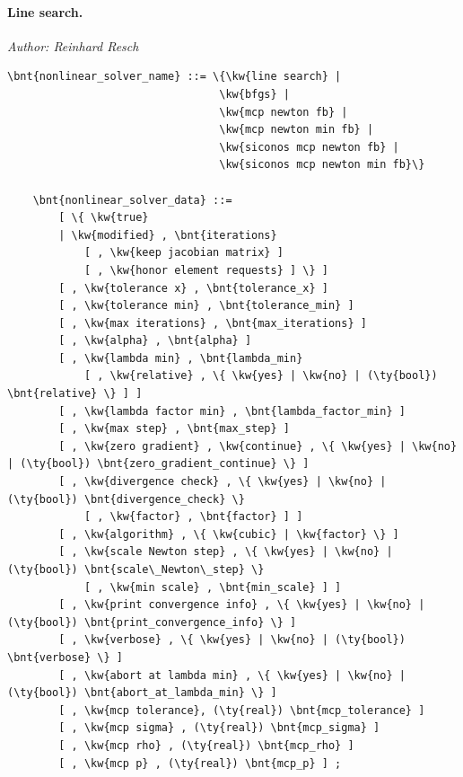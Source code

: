 \paragraph{Line search.}
\emph{Author: Reinhard Resch}
\begin{Verbatim}[commandchars=\\\{\}]
    \bnt{nonlinear_solver_name} ::= \{\kw{line search} |
                                 \kw{bfgs} |
                                 \kw{mcp newton fb} |
                                 \kw{mcp newton min fb} |
                                 \kw{siconos mcp newton fb} |
                                 \kw{siconos mcp newton min fb}\}

    \bnt{nonlinear_solver_data} ::= 
        [ \{ \kw{true}
        | \kw{modified} , \bnt{iterations}
            [ , \kw{keep jacobian matrix} ]
            [ , \kw{honor element requests} ] \} ]
        [ , \kw{tolerance x} , \bnt{tolerance_x} ]
        [ , \kw{tolerance min} , \bnt{tolerance_min} ]
        [ , \kw{max iterations} , \bnt{max_iterations} ]
        [ , \kw{alpha} , \bnt{alpha} ]
        [ , \kw{lambda min} , \bnt{lambda_min}
            [ , \kw{relative} , \{ \kw{yes} | \kw{no} | (\ty{bool}) \bnt{relative} \} ] ]
        [ , \kw{lambda factor min} , \bnt{lambda_factor_min} ]
        [ , \kw{max step} , \bnt{max_step} ]
        [ , \kw{zero gradient} , \kw{continue} , \{ \kw{yes} | \kw{no} | (\ty{bool}) \bnt{zero_gradient_continue} \} ]
        [ , \kw{divergence check} , \{ \kw{yes} | \kw{no} | (\ty{bool}) \bnt{divergence_check} \}
            [ , \kw{factor} , \bnt{factor} ] ]
        [ , \kw{algorithm} , \{ \kw{cubic} | \kw{factor} \} ]
        [ , \kw{scale Newton step} , \{ \kw{yes} | \kw{no} | (\ty{bool}) \bnt{scale\_Newton\_step} \}
            [ , \kw{min scale} , \bnt{min_scale} ] ]
        [ , \kw{print convergence info} , \{ \kw{yes} | \kw{no} | (\ty{bool}) \bnt{print_convergence_info} \} ]
        [ , \kw{verbose} , \{ \kw{yes} | \kw{no} | (\ty{bool}) \bnt{verbose} \} ]
        [ , \kw{abort at lambda min} , \{ \kw{yes} | \kw{no} | (\ty{bool}) \bnt{abort_at_lambda_min} \} ]
        [ , \kw{mcp tolerance}, (\ty{real}) \bnt{mcp_tolerance} ]
        [ , \kw{mcp sigma} , (\ty{real}) \bnt{mcp_sigma} ]
        [ , \kw{mcp rho} , (\ty{real}) \bnt{mcp_rho} ]
        [ , \kw{mcp p} , (\ty{real}) \bnt{mcp_p} ] ;
\end{Verbatim}
